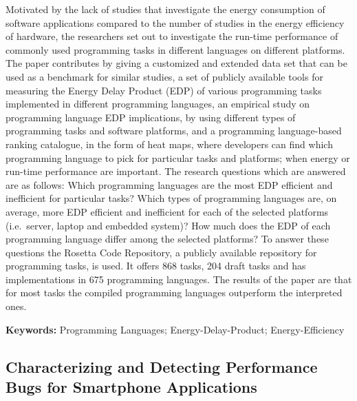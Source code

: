 \documentclass[]{book}
\begin{document}
Motivated by the lack of studies that investigate the energy consumption
of software applications compared to the number of studies in the energy
efficiency of hardware, the researchers set out to investigate the
run-time performance of commonly used programming tasks in different
languages on different platforms. The paper contributes by giving a
customized and extended data set that can be used as a benchmark for
similar studies, a set of publicly available tools for measuring the
Energy Delay Product (EDP) of various programming tasks implemented in
different programming languages, an empirical study on programming
language EDP implications, by using different types of programming tasks
and software platforms, and a programming language-based ranking
catalogue, in the form of heat maps, where developers can find which
programming language to pick for particular tasks and platforms; when
energy or run-time performance are important. The research questions
which are answered are as follows: Which programming languages are the
most EDP efficient and inefficient for particular tasks? Which types of
programming languages are, on average, more EDP efficient and
inefficient for each of the selected platforms (i.e.~server, laptop and
embedded system)? How much does the EDP of each programming language
differ among the selected platforms? To answer these questions the
Rosetta Code Repository, a publicly available repository for programming
tasks, is used. It offers 868 tasks, 204 draft tasks and has
implementations in 675 programming languages. The results of the paper
are that for most tasks the compiled programming languages outperform
the interpreted ones.

\textbf{Keywords:} Programming Languages; Energy-Delay-Product;
Energy-Efficiency

\subsection{Characterizing and Detecting Performance Bugs for Smartphone
Applications}\label{characterizing-and-detecting-performance-bugs-for-smartphone-applications}
\end{document}

